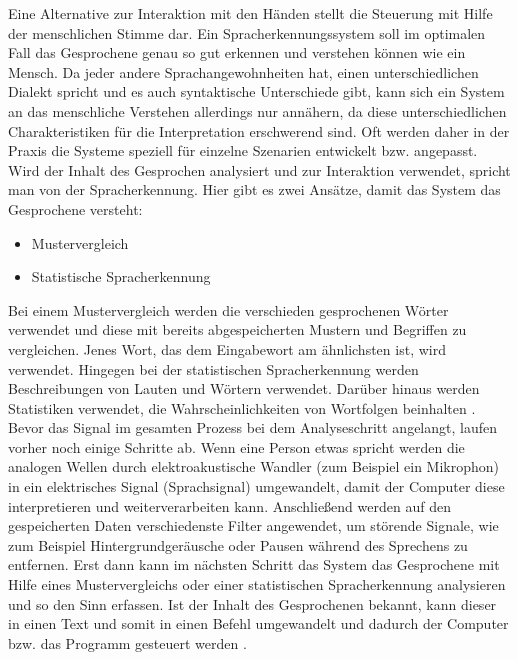 Eine Alternative zur Interaktion mit den Händen stellt die Steuerung mit Hilfe der menschlichen Stimme dar. Ein Spracherkennungssystem soll im optimalen Fall das Gesprochene genau so gut erkennen und verstehen können wie ein Mensch. Da jeder andere Sprachangewohnheiten hat, einen unterschiedlichen Dialekt spricht und es auch syntaktische Unterschiede gibt, kann sich ein System an das menschliche Verstehen allerdings nur annähern, da diese unterschiedlichen Charakteristiken für die Interpretation erschwerend sind. Oft werden daher in der Praxis die Systeme speziell für einzelne Szenarien entwickelt bzw. angepasst. 
\newlinew \newline
Wird der Inhalt des Gesprochen analysiert und zur Interaktion verwendet, spricht man von der Spracherkennung. Hier gibt es zwei Ansätze, damit das System das Gesprochene versteht:
\begin{itemize}
      \item Mustervergleich
      \item Statistische Spracherkennung
\end{itemize}
\vspace{\baselineskip}
Bei einem Mustervergleich werden die verschieden gesprochenen Wörter verwendet und diese mit bereits abgespeicherten Mustern und Begriffen zu vergleichen. Jenes Wort, das dem Eingabewort am ähnlichsten ist, wird verwendet.
Hingegen bei der statistischen Spracherkennung werden Beschreibungen von Lauten und Wörtern verwendet. Darüber hinaus werden Statistiken verwendet, die Wahrscheinlichkeiten von Wortfolgen beinhalten \cite{KaufmannPfisterSprache}. 
\newline
\newline
Bevor das Signal im gesamten Prozess bei dem Analyseschritt angelangt, laufen vorher noch einige Schritte ab. Wenn eine Person etwas spricht werden die analogen Wellen durch elektroakustische Wandler (zum Beispiel ein Mikrophon) in ein elektrisches Signal (Sprachsignal) umgewandelt, damit der Computer diese interpretieren und weiterverarbeiten kann. Anschließend werden auf den gespeicherten Daten verschiedenste Filter angewendet, um störende Signale, wie zum Beispiel Hintergrundgeräusche oder Pausen während des Sprechens zu entfernen. Erst dann kann im nächsten Schritt das System das Gesprochene mit Hilfe eines Mustervergleichs oder einer statistischen Spracherkennung analysieren und so den Sinn erfassen. Ist der Inhalt des Gesprochenen bekannt, kann dieser in einen Text und somit in einen Befehl umgewandelt und dadurch der Computer bzw. das Programm gesteuert werden \cite{KaufmannPfisterSprache}.
